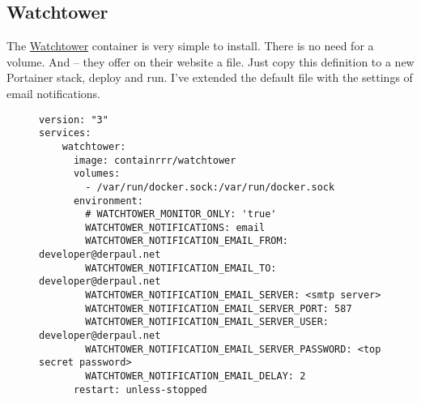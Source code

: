 

\subsection{Watchtower}

The \href{https://containrrr.dev/watchtower/}{Watchtower} container is very
simple to install. There is no need for a volume. And -- they offer on their
website a  file. Just copy this definition
to a new Portainer stack, deploy and run. I've extended the default file with
the settings of email notifications.

\begin{figure}[H]
    \scriptsize
    \centering
    \begin{BVerbatim}
version: "3"
services:
    watchtower:
      image: containrrr/watchtower
      volumes:
        - /var/run/docker.sock:/var/run/docker.sock
      environment:
        # WATCHTOWER_MONITOR_ONLY: 'true'
        WATCHTOWER_NOTIFICATIONS: email
        WATCHTOWER_NOTIFICATION_EMAIL_FROM: developer@derpaul.net
        WATCHTOWER_NOTIFICATION_EMAIL_TO: developer@derpaul.net
        WATCHTOWER_NOTIFICATION_EMAIL_SERVER: <smtp server>
        WATCHTOWER_NOTIFICATION_EMAIL_SERVER_PORT: 587
        WATCHTOWER_NOTIFICATION_EMAIL_SERVER_USER: developer@derpaul.net
        WATCHTOWER_NOTIFICATION_EMAIL_SERVER_PASSWORD: <top secret password>
        WATCHTOWER_NOTIFICATION_EMAIL_DELAY: 2
      restart: unless-stopped
    \end{BVerbatim}
\end{figure}

